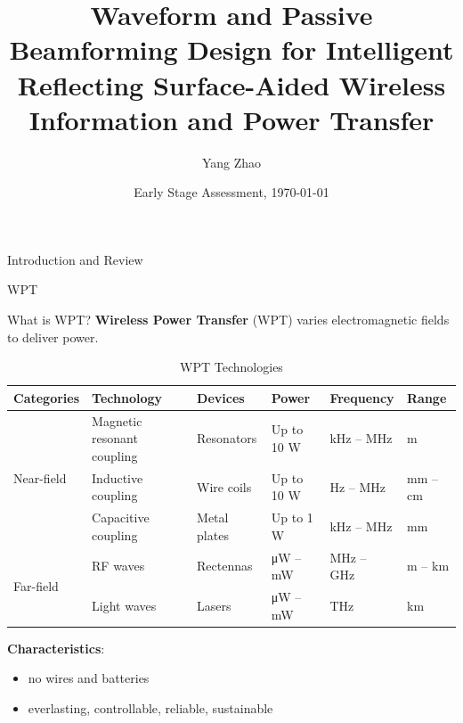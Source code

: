 \documentclass[9pt]{beamer}
\title[Waveform and Passive Beamforming Design for IRS-Aided SWIPT]{Waveform and Passive Beamforming Design for Intelligent Reflecting Surface-Aided Wireless Information and Power Transfer}
\author{Yang Zhao}
\institute{Department of Electrical and Electronic Engineering\\ Imperial College London}
\date{Early Stage Assessment, \today}
\begin{document}
\frame{\titlepage}

\begin{section}{Introduction and Review}
	\begin{subsection}{WPT}
		\begin{frame}{What is WPT?}
			\textbf{Wireless Power Transfer} (WPT) varies electromagnetic fields to deliver power.
			\vspace{1em}
			\begin{table}
				\scriptsize
				\caption{WPT Technologies}
				\begin{tabular}{|l|l|l|l|l|l|}
					\hline
					Categories                  & Technology                 & Devices           & Power                        & Frequency          & Range           \\ \hline
					\multirow{3}{*}{Near-field} & Magnetic resonant coupling & Resonators        & Up to 10 \si{\W}             & kHz -- MHz         & m               \\ \cline{2-6}
												& Inductive coupling         & Wire coils        & Up to 10 \si{\W}             & Hz -- MHz          & mm -- cm        \\ \cline{2-6}
												& Capacitive coupling        & Metal plates      & Up to 1 \si{\W}              & kHz -- MHz         & mm              \\ \hline
					\multirow{2}{*}{Far-field}  & \alert{RF waves}           & \alert{Rectennas} & \alert{\si{\uW} -- \si{\mW}} & \alert{MHz -- GHz} & \alert{m -- km} \\ \cline{2-6}
												& Light waves                & Lasers            & \si{\uW} -- \si{\mW}         & THz                & km              \\ \hline
				\end{tabular}
			\end{table}
			\vspace{1em}
			\textbf{Characteristics}:
			\begin{itemize}
				\item no wires and batteries
				\item everlasting, controllable, reliable, sustainable
			\end{itemize}
		\end{frame}


\end{subsection}
\end{section}
\end{document}
